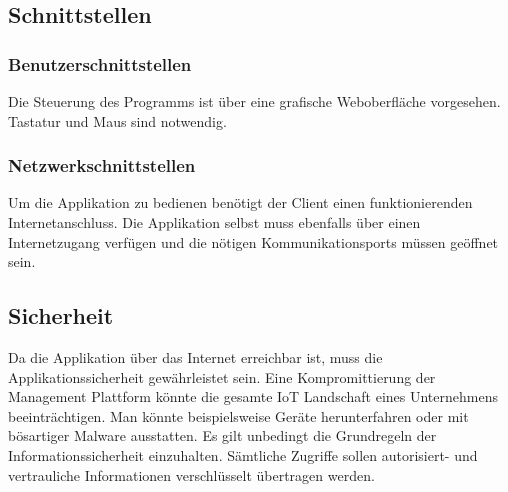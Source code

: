 \subsection{Schnittstellen}
\subsubsection{Benutzerschnittstellen}
Die Steuerung des Programms ist über eine grafische Weboberfläche vorgesehen. Tastatur und Maus sind notwendig.
\subsubsection{Netzwerkschnittstellen}
Um die Applikation zu bedienen benötigt der Client einen funktionierenden Internetanschluss. Die Applikation selbst muss ebenfalls über einen Internetzugang verfügen und die nötigen Kommunikationsports müssen geöffnet sein.
\subsection{Sicherheit}
Da die Applikation über das Internet erreichbar ist, muss die Applikationssicherheit gewährleistet sein. Eine Kompromittierung der Management Plattform könnte die gesamte IoT Landschaft eines Unternehmens beeinträchtigen. Man könnte beispielsweise Geräte herunterfahren oder mit bösartiger Malware ausstatten. Es gilt unbedingt die Grundregeln der Informationssicherheit einzuhalten. Sämtliche Zugriffe sollen autorisiert- und vertrauliche Informationen verschlüsselt übertragen werden.